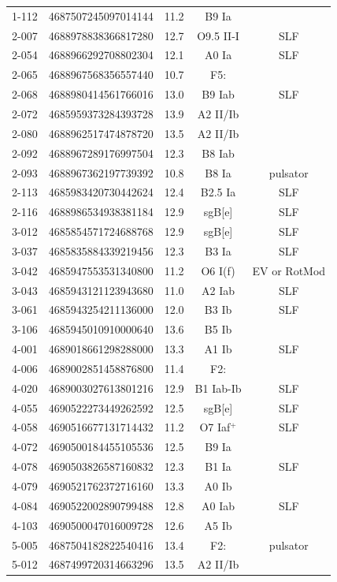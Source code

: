 \documentclass[fleqn,usenatbib]{mnras}
\begin{document}
\begin{longtable}{ccccc}
1-112 & 4687507245097014144 & 11.2 & B9 Ia & \\ 
2-007 & 4688978838366817280 & 12.7 & O9.5 II-I & SLF\\ 
2-054 & 4688966292708802304 & 12.1 & A0 Ia & SLF\\ 
2-065 & 4688967568356557440 & 10.7 & F5: &\\ 
2-068 & 4688980414561766016 & 13.0 & B9 Iab & SLF\\ 
2-072 & 4685959373284393728 & 13.9 & A2 II/Ib & \\ 
2-080 & 4688962517474878720 & 13.5 & A2 II/Ib & \\ 
2-092 & 4688967289176997504 & 12.3 & B8 Iab & \\ 
2-093 & 4688967362197739392 & 10.8 & B8 Ia & pulsator\\ 
2-113 & 4685983420730442624 & 12.4 & B2.5 Ia & SLF\\ 
2-116 & 4688986534938381184 & 12.9 & sgB[e] & SLF\\ 
3-012 & 4685854571724688768 & 12.9 & sgB[e] & SLF\\ 
3-037 & 4685835884339219456 & 12.3 & B3 Ia & SLF\\ 
3-042 & 4685947553531340800 & 11.2 & O6 I(f) & EV or RotMod\\ 
3-043 & 4685943121123943680 & 11.0 & A2 Iab & SLF\\ 
3-061 & 4685943254211136000 & 12.0 & B3 Ib & SLF\\ 
3-106 & 4685945010910000640 & 13.6 & B5 Ib & \\ 
4-001 & 4689018661298288000 & 13.3 & A1 Ib & SLF\\ 
4-006 & 4689002851458876800 & 11.4 & F2: & \\ 
4-020 & 4689003027613801216 & 12.9 & B1 Iab-Ib & SLF\\ 
4-055 & 4690522273449262592 & 12.5 & sgB[e] & SLF\\ 
4-058 & 4690516677131714432 & 11.2 & O7 Iaf$^{+}$ & SLF\\ 
4-072 & 4690500184455105536 & 12.5 & B9 Ia & \\ 
4-078 & 4690503826587160832 & 12.3 & B1 Ia & SLF\\ 
4-079 & 4690521762372716160 & 13.3 & A0 Ib & \\ 
4-084 & 4690522002890799488 & 12.8 & A0 Iab & SLF\\ 
4-103 & 4690500047016009728 & 12.6 & A5 Ib & \\ 
5-005 & 4687504182822540416 & 13.4 & F2: & pulsator\\ 
5-012 & 4687499720314663296 & 13.5 & A2 II/Ib & \\ 

\end{longtable}
\end{document}

